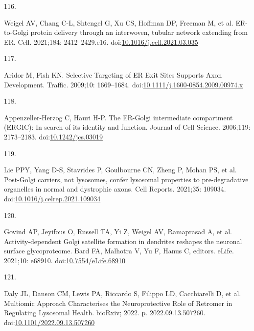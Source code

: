 \documentclass[
  12pt,
  a4paper,
]{book}
\newlength{\cslhangindent}
\newlength{\csllabelwidth}
\newlength{\cslentryspacingunit} %
\newenvironment{CSLReferences}[2] %
 {%
  \setlength{\parindent}{0pt}
  \ifodd #1
  \let\oldpar\par
  \def\par{\hangindent=\cslhangindent\oldpar}
  \fi
  \setlength{\parskip}{#2\cslentryspacingunit}
 }%
 {}
\newcommand{\CSLLeftMargin}[1]{\parbox[t]{\csllabelwidth}{#1}}
\newcommand{\CSLRightInline}[1]{\parbox[t]{\linewidth - \csllabelwidth}{#1}\break}
\begin{document}
\begin{CSLReferences}{0}{0}
\leavevmode{}%
\CSLLeftMargin{116. }%
\CSLRightInline{Weigel AV, Chang C-L, Shtengel G, Xu CS, Hoffman DP, Freeman M, et al. {ER-to-Golgi} protein delivery through an interwoven, tubular network extending from {ER}. Cell. 2021;184: 2412--2429.e16. doi:\href{https://doi.org/10.1016/j.cell.2021.03.035}{10.1016/j.cell.2021.03.035}}

\leavevmode{}%
\CSLLeftMargin{117. }%
\CSLRightInline{Aridor M, Fish KN. Selective {Targeting} of {ER Exit Sites Supports Axon Development}. Traffic. 2009;10: 1669--1684. doi:\href{https://doi.org/10.1111/j.1600-0854.2009.00974.x}{10.1111/j.1600-0854.2009.00974.x}}

\leavevmode{}%
\CSLLeftMargin{118. }%
\CSLRightInline{Appenzeller-Herzog C, Hauri H-P. The {ER-Golgi} intermediate compartment ({ERGIC}): In search of its identity and function. Journal of Cell Science. 2006;119: 2173--2183. doi:\href{https://doi.org/10.1242/jcs.03019}{10.1242/jcs.03019}}

\leavevmode{}%
\CSLLeftMargin{119. }%
\CSLRightInline{Lie PPY, Yang D-S, Stavrides P, Goulbourne CN, Zheng P, Mohan PS, et al. Post-{Golgi} carriers, not lysosomes, confer lysosomal properties to pre-degradative organelles in normal and dystrophic axons. Cell Reports. 2021;35: 109034. doi:\href{https://doi.org/10.1016/j.celrep.2021.109034}{10.1016/j.celrep.2021.109034}}

\leavevmode{}%
\CSLLeftMargin{120. }%
\CSLRightInline{Govind AP, Jeyifous O, Russell TA, Yi Z, Weigel AV, Ramaprasad A, et al. Activity-dependent {Golgi} satellite formation in dendrites reshapes the neuronal surface glycoproteome. Bard FA, Malhotra V, Yu F, Hanus C, editors. eLife. 2021;10: e68910. doi:\href{https://doi.org/10.7554/eLife.68910}{10.7554/eLife.68910}}

\leavevmode{}%
\CSLLeftMargin{121. }%
\CSLRightInline{Daly JL, Danson CM, Lewis PA, Riccardo S, Filippo LD, Cacchiarelli D, et al. Multiomic {Approach Characterises} the {Neuroprotective Role} of {Retromer} in {Regulating Lysosomal Health}. {bioRxiv}; 2022. p. 2022.09.13.507260. doi:\href{https://doi.org/10.1101/2022.09.13.507260}{10.1101/2022.09.13.507260}}


\end{CSLReferences}
\end{document}
